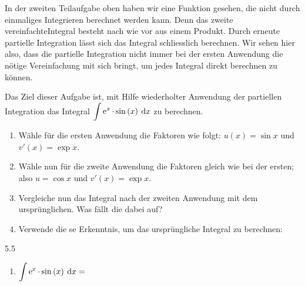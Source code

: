 	In der zweiten Teilaufgabe oben haben wir eine Funktion gesehen, die nicht durch einmaliges Integrieren berechnet werden kann. Denn das zweite \flqq vereinfachte\frqq\:Integral besteht nach wie vor aus einem Produkt. Durch erneute partielle Integration lässt sich das Integral schliesslich berechnen. Wir sehen hier also, dass die partielle Integration nicht immer bei der ersten Anwendung die nötige Vereinfachung mit sich bringt, um jedes Integral direkt berechnen zu können.
	\begin{aufgabe}
		Das Ziel dieser Aufgabe ist, mit Hilfe wiederholter Anwendung der partiellen Integration das Integral $\ds\int \exp{x}\*\sin{x}\d{x}$ zu berechnen.
		\begin{enumerate}[label=\alph*)]
			\item Wähle für die ersten Anwendung die Faktoren wie folgt: $u(x)=\sin{x}$ und $v'(x)=\exp{x}$.
		\end{enumerate}
		\begin{enumerate}[label=\alph*)]
			\setcounter{enumi}{1}
			\item Wähle nun für die zweite Anwendung die Faktoren gleich wie bei der ersten; also $u=\cos{x}$ und $v'(x)=\exp{x}$.
		\end{enumerate}
		\begin{enumerate}[label=\alph*)]
			\setcounter{enumi}{2}
			\item Vergleiche nun das Integral nach der zweiten Anwendung mit dem ursprünglichen. Was fällt die dabei auf?
		\end{enumerate}
		\begin{enumerate}[label=\alph*)]
			\setcounter{enumi}{3}
			\item Verwende die se Erkenntnis, um das ursprüngliche Integral zu berechnen:
		\end{enumerate}
		\begin{gridspace}{5.5}
			\vspace{-2mm}
			\begin{enumerate}[label=\ ,leftmargin=0mm]
				\item $\ds\int \exp{x}\*\sin{x}\d{x}=$
			\end{enumerate}
		\end{gridspace}
	\end{aufgabe}
